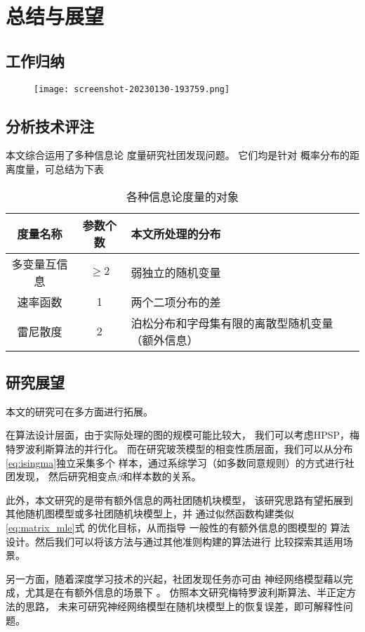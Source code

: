 \chapter{总结与展望}
\section{工作归纳}

\begin{figure}[!ht]
    \texttt{[image: screenshot-20230130-193759.png]}
\end{figure}

\section{分析技术评注}
本文综合运用了多种信息论
度量研究社团发现问题。
它们均是针对
概率分布的距离度量，可总结为下表
\begin{table}[!ht]
    \centering
  \begin{tabular}{ccp{5cm}}
    \hline
     度量名称    &   参数个数 &   本文所处理的分布 \\
    \hline
     多变量互信息 &    $\geq 2$ &    弱独立的随机变量  \\
     速率函数     &    1 &     两个二项分布的差  \\
     雷尼散度     &    2 &    泊松分布和字母集有限的离散型随机变量（额外信息） \\
    \hline
  \end{tabular}
  \caption{各种信息论度量的对象}\label{tab:info_metric}
\end{table}
  
\section{研究展望}
本文的研究可在多方面进行拓展。

在算法设计层面，由于实际处理的图的规模可能比较大，
我们可以考虑HPSP，梅特罗波利斯算法的并行化。
而在研究玻茨模型的相变性质层面，我们可以从分布
\eqref{eq:isingma}独立采集多个
样本，通过系综学习（如多数同意规则）的方式进行社团发现，
然后研究相变点$\beta$和样本数的关系。

此外，本文研究的是带有额外信息的两社团随机块模型，
该研究思路有望拓展到其他随机图模型或多社团随机块模型上，并
通过似然函数构建类似\eqref{eq:matrix_mle}式
的优化目标，从而指导
一般性的有额外信息的图模型的
算法设计。然后我们可以将该方法与通过其他准则\cite{chunaev2020community}构建的算法进行
比较探索其适用场景。

另一方面，随着深度学习技术的兴起，社团发现任务亦可由
神经网络模型藉以完成，尤其是在有额外信息的场景下 \cite{cao2018incorporating}。
仿照本文研究梅特罗波利斯算法、半正定方法的思路，
未来可研究神经网络模型在随机块模型上的恢复误差，即可解释性问题。
